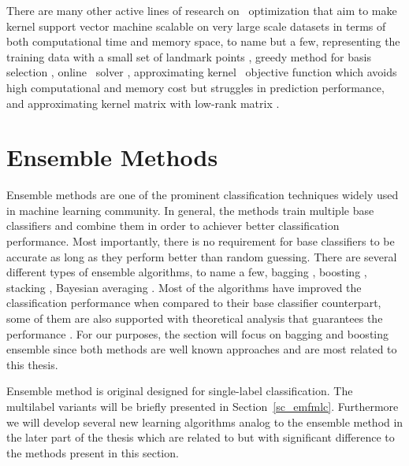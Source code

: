 {There are many other active lines of research on \svm\ optimization that aim to make kernel support vector machine scalable on very large scale datasets in terms of both computational time and memory space, to name but a few, representing the training data with a small set of landmark points \citep{Pavlov00towards,Boley04training,Yu05making,Zhang08improved}, greedy method for basis selection \citep{Keerthi06building}, online \svm\ solver \citep{Bordes05fast}, approximating kernel \svm\ objective function \citep{Zhang12scaling, Le13fast} which avoids high computational and memory cost but struggles in prediction performance, and approximating kernel matrix with low-rank matrix \citep{Smola00sparse,Fine02efficient,Drineas05on,Si14memory}.
\fi


%
%
%
\section{Ensemble Methods} \label{sc_em}

Ensemble methods are one of the prominent classification techniques widely used in machine learning community.
In general, the methods train multiple base classifiers and combine them in order to achiever better classification performance.
Most importantly, there is no requirement for base classifiers to be accurate as long as they perform better than random guessing.
There are several different types of ensemble algorithms, to name a few, bagging \citep{Breiman96bagging}, boosting \citep{Freund97a,Schapire99improved}, stacking \citep{Smyth99linearly}, Bayesian averaging \citep{Freund04generalization}.
Most of the algorithms have improved the classification performance when compared to their base classifier counterpart, some of them are also supported with theoretical analysis that guarantees the performance \citep{Schapire97boosting,Koltchinskii00empirical,Cortes14semble,Cortes14deep}.
For our purposes, the section will focus on bagging and boosting ensemble since both methods are well known approaches and are most related to this thesis.

Ensemble method is original designed for single-label classification.
The multilabel variants will be briefly presented in Section~\ref{sc_emfmlc}.
Furthermore we will develop several new learning algorithms analog to the ensemble method in the later part of the thesis which are related to but with significant difference to the methods present in this section.



}
